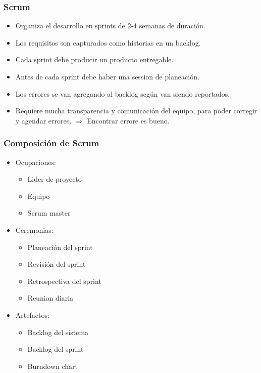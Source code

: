 \documentclass{beamer}
\begin{document}
\begin{frame}
    \frametitle{Scrum}
    \begin{itemize}
        \item{Organiza el desarrollo en sprints de 2-4 semanas de duraci\'on.}
        \item{Los requisitos son capturados como historias en un backlog.}
        \item{Cada sprint debe producir un producto entregable.}
        \item{Antes de cada sprint debe haber una session de planeaci\'on.}
        \item{Los errores se van agregando al backlog seg\'un van siendo reportados.}
        \item{Requiere mucha transparencia y comunicaci\'on del equipo,
        para poder corregir y agendar errores. $\Rightarrow$ Encontrar errore es bueno.}
    \end{itemize}
\end{frame}

\begin{frame}
    \frametitle{Composici\'on de Scrum}
    \begin{itemize}
        \item{Ocupaciones:
            \begin{itemize}
                \item{Lider de proyecto}
                \item{Equipo}
                \item{Scrum master}
            \end{itemize}
        }
        \item{Ceremonias:
            \begin{itemize}
                \item{Planeaci\'on del sprint}
                \item{Revisi\'on del sprint}
                \item{Retrospectiva del sprint}
                \item{Reunion diaria}
            \end{itemize}
        }
        \item{Artefactos:
            \begin{itemize}
                \item{Backlog del sistema}
                \item{Backlog del sprint}
                \item{Burndown chart}
            \end{itemize}
        }
    \end{itemize}
\end{frame}
\end{document}
